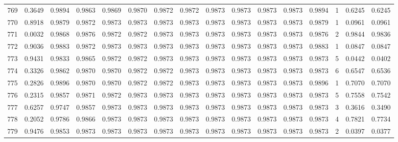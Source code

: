 \begin{tabular}{lrrrrrrrrrrrrrrr}
769 &      0.3649 &  0.9894 &  0.9863 &  0.9869 &  0.9870 &  0.9872 &  0.9872 &  0.9873 &  0.9873 &  0.9873 &   0.9873 &     0.9894 &      1 &                    0.6245 &                     0.6245 \\
770 &      0.8918 &  0.9879 &  0.9872 &  0.9873 &  0.9873 &  0.9873 &  0.9873 &  0.9873 &  0.9873 &  0.9873 &   0.9873 &     0.9879 &      1 &                    0.0961 &                     0.0961 \\
771 &      0.0032 &  0.9868 &  0.9876 &  0.9872 &  0.9872 &  0.9873 &  0.9873 &  0.9873 &  0.9873 &  0.9873 &   0.9873 &     0.9876 &      2 &                    0.9844 &                     0.9836 \\
772 &      0.9036 &  0.9883 &  0.9872 &  0.9873 &  0.9873 &  0.9873 &  0.9873 &  0.9873 &  0.9873 &  0.9873 &   0.9873 &     0.9883 &      1 &                    0.0847 &                     0.0847 \\
773 &      0.9431 &  0.9833 &  0.9865 &  0.9872 &  0.9872 &  0.9873 &  0.9873 &  0.9873 &  0.9873 &  0.9873 &   0.9873 &     0.9873 &      5 &                    0.0442 &                     0.0402 \\
774 &      0.3326 &  0.9862 &  0.9870 &  0.9870 &  0.9872 &  0.9872 &  0.9873 &  0.9873 &  0.9873 &  0.9873 &   0.9873 &     0.9873 &      6 &                    0.6547 &                     0.6536 \\
775 &      0.2826 &  0.9896 &  0.9870 &  0.9870 &  0.9872 &  0.9872 &  0.9873 &  0.9873 &  0.9873 &  0.9873 &   0.9873 &     0.9896 &      1 &                    0.7070 &                     0.7070 \\
776 &      0.2315 &  0.9857 &  0.9871 &  0.9872 &  0.9873 &  0.9873 &  0.9873 &  0.9873 &  0.9873 &  0.9873 &   0.9873 &     0.9873 &      5 &                    0.7558 &                     0.7542 \\
777 &      0.6257 &  0.9747 &  0.9857 &  0.9873 &  0.9873 &  0.9873 &  0.9873 &  0.9873 &  0.9873 &  0.9873 &   0.9873 &     0.9873 &      3 &                    0.3616 &                     0.3490 \\
778 &      0.2052 &  0.9786 &  0.9866 &  0.9873 &  0.9873 &  0.9873 &  0.9873 &  0.9873 &  0.9873 &  0.9873 &   0.9873 &     0.9873 &      4 &                    0.7821 &                     0.7734 \\
779 &      0.9476 &  0.9853 &  0.9873 &  0.9873 &  0.9873 &  0.9873 &  0.9873 &  0.9873 &  0.9873 &  0.9873 &   0.9873 &     0.9873 &      2 &                    0.0397 &                     0.0377 \\

\end{tabular}
